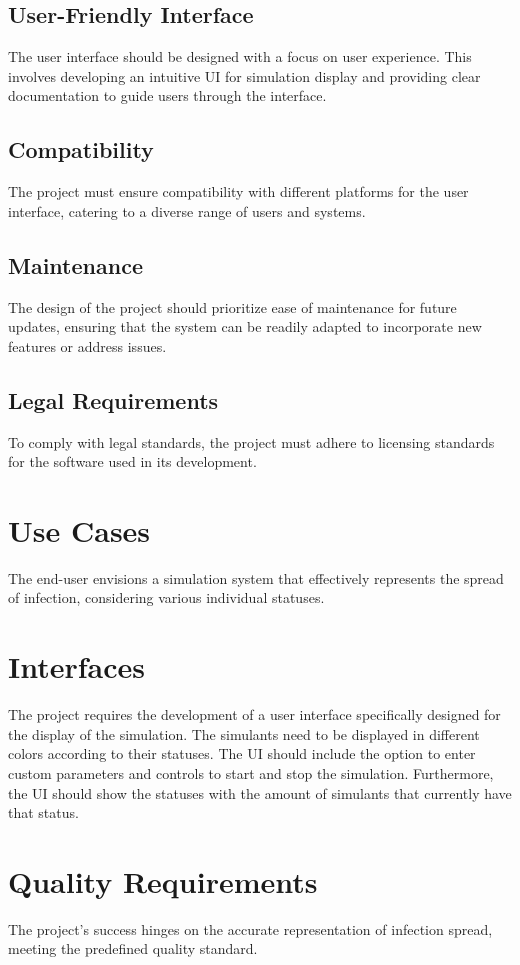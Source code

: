 \documentclass{article}
\begin{document}
	\subsection{User-Friendly Interface}
	The user interface should be designed with a focus on user experience. This involves developing an intuitive UI for simulation display and providing clear documentation to guide users through the interface.
	
	\subsection{Compatibility}
	The project must ensure compatibility with different platforms for the user interface, catering to a diverse range of users and systems.
	
	\subsection{Maintenance}
	The design of the project should prioritize ease of maintenance for future updates, ensuring that the system can be readily adapted to incorporate new features or address issues.
	
	\subsection{Legal Requirements}
	To comply with legal standards, the project must adhere to licensing standards for the software used in its development.
	
	\section{Use Cases}
	The end-user envisions a simulation system that effectively represents the spread of infection, considering various individual statuses.
	
	\section{Interfaces}
	The project requires the development of a user interface specifically designed for the display of the simulation. The simulants need to be displayed in different colors according to their statuses. The UI should include the option to enter custom parameters and controls to start and stop the simulation. Furthermore, the UI should show the statuses with the amount of simulants that currently have that status.
	
	\section{Quality Requirements}
	The project's success hinges on the accurate representation of infection spread, meeting the predefined quality standard.
	
\end{document}
